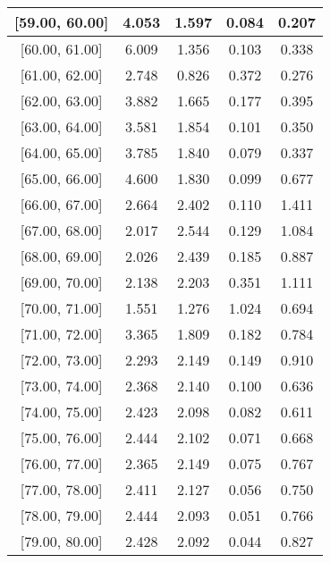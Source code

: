\documentclass[12pt]{article}
\begin{document}
\begin{table}[]
\begin{tabular}{c|c|c|c|c|}
\multicolumn{1}{|c|}{{[}59.00,  60.00{]}}  & 4.053 & 1.597 & 0.084 & 0.207 \\ \hline 
\multicolumn{1}{|c|}{{[}60.00,  61.00{]}}  & 6.009 & 1.356 & 0.103 & 0.338 \\ \hline 
\multicolumn{1}{|c|}{{[}61.00,  62.00{]}}  & 2.748 & 0.826 & 0.372 & 0.276 \\ \hline 
\multicolumn{1}{|c|}{{[}62.00,  63.00{]}}  & 3.882 & 1.665 & 0.177 & 0.395 \\ \hline 
\multicolumn{1}{|c|}{{[}63.00,  64.00{]}}  & 3.581 & 1.854 & 0.101 & 0.350 \\ \hline 
\multicolumn{1}{|c|}{{[}64.00,  65.00{]}}  & 3.785 & 1.840 & 0.079 & 0.337 \\ \hline 
\multicolumn{1}{|c|}{{[}65.00,  66.00{]}}  & 4.600 & 1.830 & 0.099 & 0.677 \\ \hline 
\multicolumn{1}{|c|}{{[}66.00,  67.00{]}}  & 2.664 & 2.402 & 0.110 & 1.411 \\ \hline 
\multicolumn{1}{|c|}{{[}67.00,  68.00{]}}  & 2.017 & 2.544 & 0.129 & 1.084 \\ \hline 
\multicolumn{1}{|c|}{{[}68.00,  69.00{]}}  & 2.026 & 2.439 & 0.185 & 0.887 \\ \hline 
\multicolumn{1}{|c|}{{[}69.00,  70.00{]}}  & 2.138 & 2.203 & 0.351 & 1.111 \\ \hline 
\multicolumn{1}{|c|}{{[}70.00,  71.00{]}}  & 1.551 & 1.276 & 1.024 & 0.694 \\ \hline 
\multicolumn{1}{|c|}{{[}71.00,  72.00{]}}  & 3.365 & 1.809 & 0.182 & 0.784 \\ \hline 
\multicolumn{1}{|c|}{{[}72.00,  73.00{]}}  & 2.293 & 2.149 & 0.149 & 0.910 \\ \hline 
\multicolumn{1}{|c|}{{[}73.00,  74.00{]}}  & 2.368 & 2.140 & 0.100 & 0.636 \\ \hline 
\multicolumn{1}{|c|}{{[}74.00,  75.00{]}}  & 2.423 & 2.098 & 0.082 & 0.611 \\ \hline 
\multicolumn{1}{|c|}{{[}75.00,  76.00{]}}  & 2.444 & 2.102 & 0.071 & 0.668 \\ \hline 
\multicolumn{1}{|c|}{{[}76.00,  77.00{]}}  & 2.365 & 2.149 & 0.075 & 0.767 \\ \hline 
\multicolumn{1}{|c|}{{[}77.00,  78.00{]}}  & 2.411 & 2.127 & 0.056 & 0.750 \\ \hline 
\multicolumn{1}{|c|}{{[}78.00,  79.00{]}}  & 2.444 & 2.093 & 0.051 & 0.766 \\ \hline 
\multicolumn{1}{|c|}{{[}79.00,  80.00{]}}  & 2.428 & 2.092 & 0.044 & 0.827 \\ \hline 

\end{tabular}
\end{table}
\end{document}
